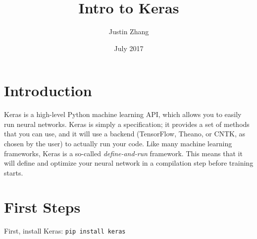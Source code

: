\documentclass{article}
\title{Intro to Keras}
\author{Justin Zhang}
\date{July 2017}
\begin{document}
\maketitle

\section{Introduction}
    Keras is a high-level Python machine learning API, which allows you to easily run neural networks. Keras is simply a specification; it provides a set of methods that you can use, and it will use a backend (TensorFlow, Theano, or CNTK, as chosen by the user) to actually run your code. Like many machine learning frameworks, Keras is a so-called \textit{define-and-run} framework. This means that it will define and optimize your neural network in a compilation step before training starts.
\section{First Steps}
    First, install Keras: \verb|pip install keras|
    
\end{document}
